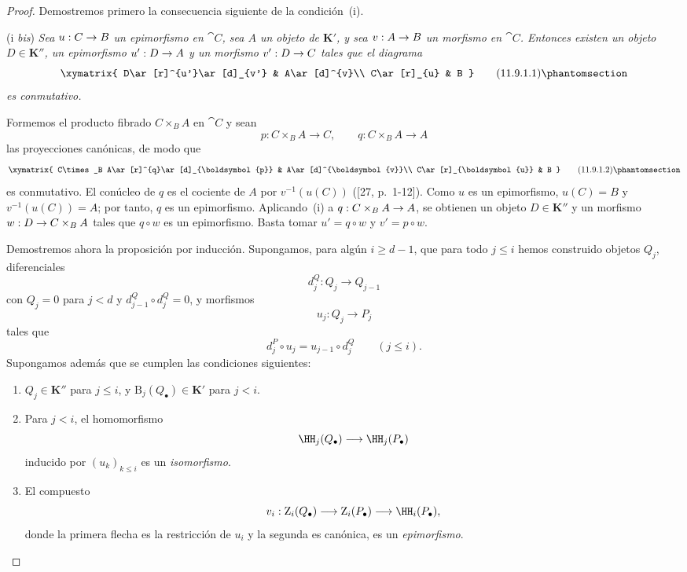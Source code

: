 \documentclass[oneside]{amsart}
\makeatletter
\renewcommand{\leq}{\leqslant}
\renewcommand{\geq}{\geqslant}
\newcommand{\ega@arrow}[2]{\mathchoice{#1}{#2}{#2}{#2}}
\renewcommand{\to}{\ega@arrow{\longrightarrow}{\rightarrow}}
\newcommand{\oldpage}[2][]{{\marginnote{\normalfont\textbf{#1}~|~#2}}\ignorespaces}
\let\EGAOriginalLabel\label
\renewcommand{\label}[1]{\phantomsection\EGAOriginalLabel{#1}}
\makeatother
\begin{document}
\begin{proof}
Demostremos primero la consecuencia siguiente de la condición~(i).

\medskip\noindent
(i \emph{bis})
\emph{Sea $u:C\to B$ un epimorfismo en $\cat{C}$, sea $A$ un
objeto de $\boldsymbol K'$, y sea $v:A\to B$ un morfismo en $\cat{C}$.
Entonces existen un objeto $D\in\boldsymbol K''$, un epimorfismo $u':D\to A$ y un
morfismo $v':D\to C$ tales que el diagrama}
\[
  \xymatrix{
    D\ar[r]^{u'}\ar[d]_{v'} & A\ar[d]^{v}\\
    C\ar[r]_{u} & B
  }
  \tag{11.9.1.1}\label{0.11.9.1.1}
\]
\emph{es conmutativo.}

Formemos el producto fibrado $C\times_B A$ en $\cat{C}$ y sean
\[
  p:C\times_B A\longrightarrow C,
  \qquad
  q:C\times_B A\longrightarrow A
\]
las proyecciones canónicas, de modo que
\oldpage[0\textsubscript{III}]{47}
\[
  \xymatrix{
    C\times_B A\ar[r]^{q}\ar[d]_{\boldsymbol{p}} & A\ar[d]^{\boldsymbol{v}}\\
    C\ar[r]_{\boldsymbol{u}} & B
  }
  \tag{11.9.1.2}\label{0.11.9.1.2}
\]
es conmutativo.
El conúcleo de $q$ es el cociente de $A$ por $v^{-1}(u(C))$
([27, p.~1-12]).
Como $u$ es un epimorfismo, $u(C)=B$ y
$v^{-1}(u(C))=A$; por tanto, $q$ es un epimorfismo.
Aplicando~(i) a $q:C\times_B A\to A$, se obtienen un objeto
$D\in\boldsymbol K''$ y un morfismo $w:D\to C\times_B A$ tales que $q\circ w$ es
un epimorfismo.
Basta tomar $u'=q\circ w$ y $v'=p\circ w$.

\medskip
Demostremos ahora la proposición por inducción.
Supongamos, para algún $i\geq d-1$, que para todo $j\leq i$ hemos
construido objetos $Q_j$, diferenciales
\[
  d^Q_j:Q_j\longrightarrow Q_{j-1}
\]
con $Q_j=0$ para $j<d$ y
$d^Q_{j-1}\circ d^Q_j=0$, y morfismos
\[
  u_j:Q_j\longrightarrow P_j
\]
tales que
\[
  d^P_j\circ u_j=u_{j-1}\circ d^Q_j
  \qquad(j\leq i).
\]
Supongamos además que se cumplen las condiciones siguientes:
\begin{enumerate}
  \item[$(\mathrm{I}_i)$]
  $Q_j\in\boldsymbol K''$ para $j\leq i$, y
  $\mathrm{B}_j(Q_\bullet)\in\boldsymbol K'$ para $j<i$.

  \item[$(\mathrm{II}_i)$]
  Para $j<i$, el homomorfismo
  \[
    \HH_j(Q_\bullet)\longrightarrow\HH_j(P_\bullet)
  \]
  inducido por $(u_k)_{k\leq i}$ es un \emph{isomorfismo}.

  \item[$(\mathrm{III}_i)$]
  El compuesto
  \[
    v_i:
    \mathrm{Z}_i(Q_\bullet)
    \longrightarrow
    \mathrm{Z}_i(P_\bullet)
    \longrightarrow
    \HH_i(P_\bullet),
  \]
  donde la primera flecha es la restricción de $u_i$ y la segunda es
  canónica, es un \emph{epimorfismo}.
\end{enumerate}


\end{proof}
\end{document}
